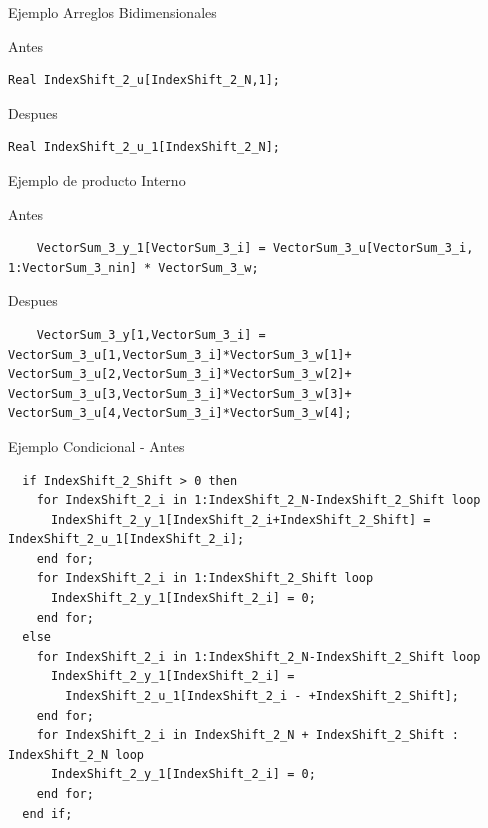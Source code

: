 \documentclass[10pt,presentation]{beamer}
\begin{document}
\begin{frame}[fragile]{Ejemplo Arreglos Bidimensionales}
\begin{block}{Antes}
\begin{verbatim}
Real IndexShift_2_u[IndexShift_2_N,1];
\end{verbatim}
\end{block}

\begin{block}{Despues}
\begin{verbatim}
Real IndexShift_2_u_1[IndexShift_2_N];
\end{verbatim}
\end{block}
\end{frame}



\begin{frame}[fragile]{Ejemplo de producto Interno}
\begin{block}{Antes}
\begin{verbatim}
    VectorSum_3_y_1[VectorSum_3_i] = VectorSum_3_u[VectorSum_3_i, 1:VectorSum_3_nin] * VectorSum_3_w;
\end{verbatim}
\end{block}
	
\begin{block}{Despues}
\begin{verbatim}
    VectorSum_3_y[1,VectorSum_3_i] = VectorSum_3_u[1,VectorSum_3_i]*VectorSum_3_w[1]+ VectorSum_3_u[2,VectorSum_3_i]*VectorSum_3_w[2]+ VectorSum_3_u[3,VectorSum_3_i]*VectorSum_3_w[3]+ VectorSum_3_u[4,VectorSum_3_i]*VectorSum_3_w[4];
\end{verbatim}
\end{block}
\end{frame}

\begin{frame}[fragile]{Ejemplo Condicional - Antes}
\begin{verbatim}
  if IndexShift_2_Shift > 0 then
    for IndexShift_2_i in 1:IndexShift_2_N-IndexShift_2_Shift loop
      IndexShift_2_y_1[IndexShift_2_i+IndexShift_2_Shift] = IndexShift_2_u_1[IndexShift_2_i];
    end for;
    for IndexShift_2_i in 1:IndexShift_2_Shift loop
      IndexShift_2_y_1[IndexShift_2_i] = 0;
    end for;
  else
    for IndexShift_2_i in 1:IndexShift_2_N-IndexShift_2_Shift loop
      IndexShift_2_y_1[IndexShift_2_i] = 
		IndexShift_2_u_1[IndexShift_2_i - +IndexShift_2_Shift];
    end for;
    for IndexShift_2_i in IndexShift_2_N + IndexShift_2_Shift : IndexShift_2_N loop
      IndexShift_2_y_1[IndexShift_2_i] = 0;
    end for;
  end if;
\end{verbatim}
\end{frame}
\end{document}
